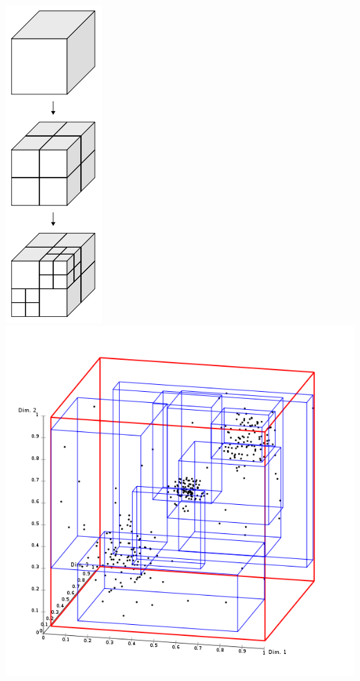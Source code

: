 \documentclass{beamer}
\begin{document}
{\begin{columns}[c]
    \\
    \includegraphics[width=.1\textwidth]{octree_cropped.png}
    \includegraphics[width=.4\textwidth]{rtree.png}
    \end{columns}
}

\end{document}
